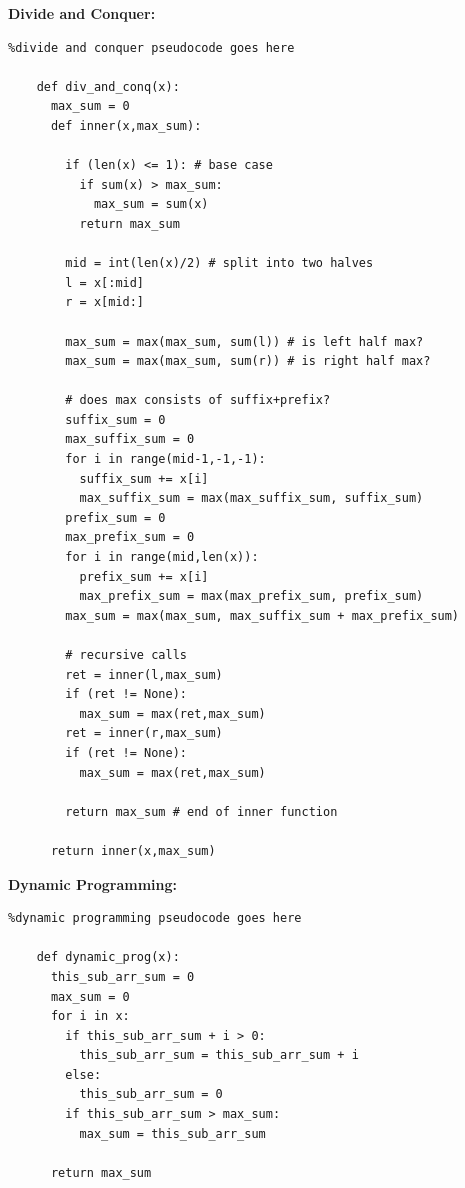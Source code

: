 \documentclass[letterpaper,10pt,titlepage,fleqn]{article}
\begin{document}
    \begin{centering}
    \textbf{Divide and Conquer:}
    \end{centering}
    \begin{lstlisting}%divide and conquer pseudocode goes here

    def div_and_conq(x):
      max_sum = 0
      def inner(x,max_sum):    

        if (len(x) <= 1): # base case
          if sum(x) > max_sum:
            max_sum = sum(x)
          return max_sum

        mid = int(len(x)/2) # split into two halves
        l = x[:mid]
        r = x[mid:]

        max_sum = max(max_sum, sum(l)) # is left half max?
        max_sum = max(max_sum, sum(r)) # is right half max?

        # does max consists of suffix+prefix?
        suffix_sum = 0 
        max_suffix_sum = 0
        for i in range(mid-1,-1,-1):
          suffix_sum += x[i]
          max_suffix_sum = max(max_suffix_sum, suffix_sum)
        prefix_sum = 0
        max_prefix_sum = 0
        for i in range(mid,len(x)):
          prefix_sum += x[i]
          max_prefix_sum = max(max_prefix_sum, prefix_sum)
        max_sum = max(max_sum, max_suffix_sum + max_prefix_sum)

        # recursive calls
        ret = inner(l,max_sum) 
        if (ret != None):
          max_sum = max(ret,max_sum)
        ret = inner(r,max_sum)  
        if (ret != None):
          max_sum = max(ret,max_sum)  

        return max_sum # end of inner function

      return inner(x,max_sum)

    \end{lstlisting}

    \begin{centering}
    \textbf{Dynamic Programming:}
    \end{centering}
    \begin{lstlisting}%dynamic programming pseudocode goes here

    def dynamic_prog(x):
      this_sub_arr_sum = 0 
      max_sum = 0
      for i in x:
        if this_sub_arr_sum + i > 0: 
          this_sub_arr_sum = this_sub_arr_sum + i
        else:
          this_sub_arr_sum = 0
        if this_sub_arr_sum > max_sum:
          max_sum = this_sub_arr_sum

      return max_sum

    \end{lstlisting}
\end{document}
